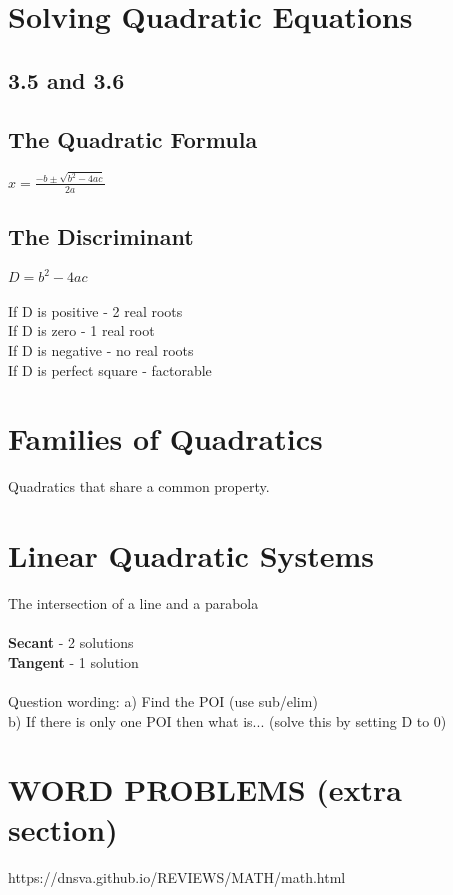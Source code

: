 \documentclass{article}
\begin{document}

\section{Solving Quadratic Equations}

\subsection*{3.5 and 3.6}

\subsection*{The Quadratic Formula}
$x=\frac{-b\pm\sqrt{b^2-4ac}}{2a}$

\subsection*{The Discriminant}
$D = b^2-4ac$\\\\
\noindent
If D is positive - 2 real roots\\
If D is zero - 1 real root\\
If D is negative - no real roots\\
If D is perfect square - factorable\\



\section{Families of Quadratics}
Quadratics that share a common property.


\section{Linear Quadratic Systems}
The intersection of a line and a parabola\\\\

\noindent
\textbf{Secant} - 2 solutions\\
\textbf{Tangent} - 1 solution\\\\

\noindent
Question wording: 
a) Find the POI (use sub/elim)\\
b) If there is only one POI then what is... (solve this by setting D to 0)\\

\section{WORD PROBLEMS (extra section)}

https://dnsva.github.io/REVIEWS/MATH/math.html


\end{document}
